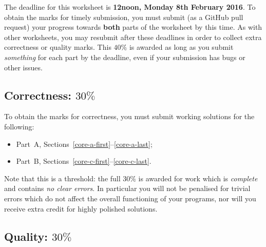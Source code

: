 \documentclass{scrartcl}
\begin{document}
The deadline for this worksheet is \textbf{12noon, Monday 8th February 2016}.
To obtain the marks for timely submission, you must submit (as a GitHub pull request) your progress towards \textbf{both} parts of the worksheet by this time.
As with other worksheets, you may resubmit after these deadlines in order to collect extra correctness or quality marks.
This $40\%$ is awarded as long as you submit \emph{something} for each part by the deadline,
even if your submission has bugs or other issues.

\subsection*{Correctness: $30\%$}

To obtain the marks for correctness, you must submit working solutions for the following:
\begin{itemize}
\item Part~A, Sections~\ref{core-a-first}--\ref{core-a-last};
\item Part~B, Sections~\ref{core-c-first}--\ref{core-c-last}.
\end{itemize}
Note that this is a threshold: the full $30\%$ is awarded for work which is \emph{complete}
and contains \emph{no clear errors}. In particular you will not be penalised for trivial errors which do not
affect the overall functioning of your programs, nor will you receive extra credit for highly polished solutions.

\subsection*{Quality: $30\%$}
\end{document}
